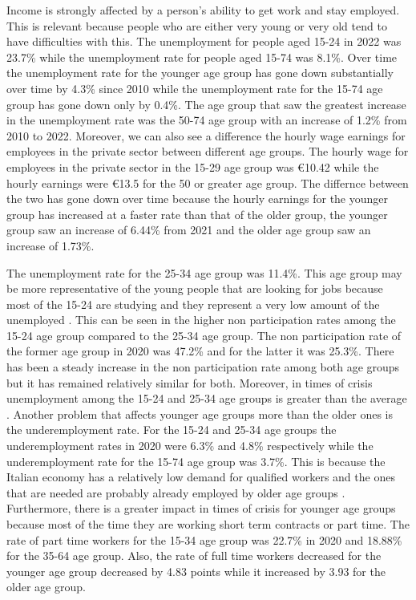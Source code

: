 \documentclass[12pt]{article}
\begin{document}
\begin{spacing}{1.5}

Income is strongly affected by a person's ability to get work and stay employed. This is relevant because people who are either very young or very old tend to have difficulties with this. The unemployment for people aged 15-24 in 2022 was 23.7\% while the unemployment rate for people aged 15-74 was 8.1\%. Over time the unemployment rate for the younger age group has gone down substantially over time by 4.3\% since 2010 while the unemployment rate for the 15-74 age group has gone down only by 0.4\%. The age group that saw the greatest increase in the unemployment rate was the 50-74 age group with an increase of 1.2\% from 2010 to 2022. Moreover, we can also see a difference the hourly wage earnings for employees in the private sector between different age groups. The hourly wage for employees in the private sector in the 15-29 age group was €10.42 while the hourly earnings were €13.5 for the 50 or greater age group. The differnce between the two has gone down over time because the hourly earnings for the younger group has increased at a faster rate than that of the older group, the younger group saw an increase of 6.44\% from 2021 and the older age group saw an increase of 1.73\%. 

The unemployment rate for the 25-34 age group was 11.4\%. This age group may be more representative of the young people that are looking for jobs because most of the 15-24 are studying and they represent a very low amount of the unemployed \cite{pontecorvo2018giovani}. This can be seen in the higher non participation rates among the 15-24 age group compared to the 25-34 age group. The non participation rate of the former age group in 2020 was 47.2\% and for the latter it was 25.3\%. There has been a steady increase in the non participation rate among both age groups but it has remained relatively similar for both. Moreover, in times of crisis unemployment among the 15-24 and 25-34 age groups is greater than the average \cite{pontecorvo2018giovani}. Another problem that affects younger age groups more than the older ones is the underemployment rate. For the 15-24 and 25-34 age groups the underemployment rates in 2020 were 6.3\% and 4.8\% respectively while the underemployment rate for the 15-74 age group was 3.7\%. This is because the Italian economy has a relatively low demand for qualified workers and the ones that are needed are probably already employed by older age groups \cite{pontecorvo2018giovani}. Furthermore, there is a greater impact in times of crisis for younger age groups because most of the time they are working short term contracts or part time. The rate of part time workers for the 15-34 age group was 22.7\% in 2020 and 18.88\% for the 35-64 age group. Also, the rate of full time workers decreased for the younger age group decreased by 4.83 points while it increased by 3.93 for the older age group.


\end{spacing}
\end{document}
